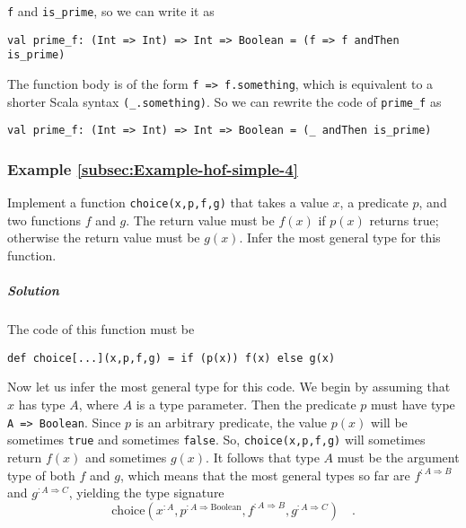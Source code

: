 \lstinline!f! and \lstinline!is_prime!,
so we can write it as
\begin{lstlisting}
val prime_f: (Int => Int) => Int => Boolean = (f => f andThen is_prime)
\end{lstlisting}
The function body is of the form \lstinline!f => f.something!,
which is equivalent to a shorter Scala syntax \lstinline!(_.something)!.
So we can rewrite the code of \lstinline!prime_f!
as
\begin{lstlisting}
val prime_f: (Int => Int) => Int => Boolean = (_ andThen is_prime)
\end{lstlisting}

\subsubsection{Example \label{subsec:Example-hof-simple-4}\ref{subsec:Example-hof-simple-4}}

Implement a function \lstinline!choice(x,p,f,g)!
that takes a value $x$, a predicate $p$, and two functions $f$
and $g$. The return value must be $f(x)$ if $p(x)$ returns true;
otherwise the return value must be $g(x)$. Infer the most general
type for this function.

\subparagraph{Solution}

The code of this function must be
\begin{lstlisting}
def choice[...](x,p,f,g) = if (p(x)) f(x) else g(x)
\end{lstlisting}
Now let us infer the most general type for this code. We begin by
assuming that $x$ has type $A$, where $A$ is a type parameter.
Then the predicate $p$ must have type \lstinline!A => Boolean!.
Since $p$ is an arbitrary predicate, the value $p(x)$ will be sometimes
\lstinline!true! and sometimes
\lstinline!false!. So,
\lstinline!choice(x,p,f,g)!
will sometimes return $f(x)$ and sometimes $g(x)$. It follows that
type $A$ must be the argument type of both $f$ and $g$, which means
that the most general types so far are $f^{:A\Rightarrow B}$ and
$g^{:A\Rightarrow C}$, yielding the type signature
\[
\text{choice}(x^{:A},p^{:A\Rightarrow\text{Boolean}},f^{:A\Rightarrow B},g^{:A\Rightarrow C})\quad.
\]

